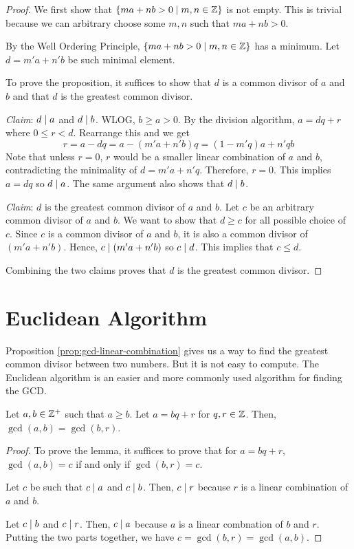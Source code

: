 \begin{proof}
    We first show that $\{ma+nb > 0 \mid m,n \in \mathbb{Z}\}$ is not empty. This is trivial because we can arbitrary choose some $m,n$ such that $ma+nb > 0$.

    By the Well Ordering Principle, $\{ma+nb > 0 \mid m,n \in \mathbb{Z}\}$ has a minimum. Let $d = m'a + n'b$ be such minimal element.

    To prove the proposition, it suffices to show that $d$ is a common divisor of $a$ and $b$ and that $d$ is the greatest common divisor.

    \textit{Claim}: $d \mathrel{\mid} a$ and $d \mathrel{\mid} b$. WLOG, $b \geq a > 0$. By the division algorithm, $a = dq + r$ where $0 \leq r < d$. Rearrange this and we get
    $$
    r = a - dq = a - (m'a + n'b) q = (1 - m'q) a + n'q b
    $$
    Note that unless $r = 0$, $r$ would be a smaller linear combination of $a$ and $b$, contradicting the minimality of $d = m'a + n'q$. Therefore, $r = 0$. This implies $a = dq$ so $d \mathrel{\mid} a$. The same argument also shows that $d \mathrel{\mid} b$.

    \textit{Claim}: $d$ is the greatest common divisor of $a$ and $b$. Let $c$ be an arbitrary common divisor of $a$ and $b$. We want to show that $d \geq c$ for all possible choice of $c$. Since $c$ is a common divisor of $a$ and $b$, it is also a common divisor of $(m'a+n'b)$. Hence, $c \mathrel{\mid} (m'a + n'b)$ so $c \mathrel{\mid} d$. This implies that $c \leq d$.

    Combining the two claims proves that $d$ is the greatest common divisor.
\end{proof}

\section{Euclidean Algorithm}

Proposition \ref{prop:gcd-linear-combination} gives us a way to find the greatest common divisor between two numbers. But it is not easy to compute. The Euclidean algorithm is an easier and more commonly used algorithm for finding the GCD.

\begin{lemma} \label{lem:eucliean-algo-lemma}
    Let $a,b \in \mathbb{Z}^+$ such that $a \geq b$. Let $a = bq + r$ for $q,r \in \mathbb{Z}$. Then, $\gcd(a,b) = \gcd(b,r)$.
\end{lemma}

\begin{proof}
    To prove the lemma, it suffices to prove that for $a = bq + r$, $\gcd(a,b) = c$ if and only if $\gcd(b,r)= c$.

    Let $c$ be such that $c \mathrel{\mid} a$ and $c \mathrel{\mid} b$. Then, $c \mathrel{\mid} r$ because $r$ is a linear combination of $a$ and $b$.

    Let $c \mathrel{\mid} b$ and $c \mathrel{\mid} r$. Then, $c \mathrel{\mid} a$ because $a$ is a linear combnation of $b$ and $r$. Putting the two parts together, we have $c = \gcd(b,r) = \gcd(a,b)$.
\end{proof}

